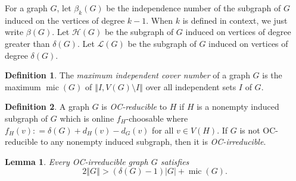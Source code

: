 \documentclass[12pt]{article}
\title{}
\author{}
\theoremstyle{plain}
\newtheorem{lem}[thm]{Lemma}
\theoremstyle{definition}
\newtheorem{defn}{Definition}
\theoremstyle{remark}
\newcommand{\fancy}[1]{\mathcal{#1}}
\renewcommand{\L}{\fancy{L}}
\newcommand{\HH}{\fancy{H}}
\newcommand{\card}[1]{\left|#1\right|}
\newcommand{\size}[1]{\left\Vert#1\right\Vert}
\newcommand{\DefinedAs}{\mathrel{\mathop:}=}
\newcommand{\mic}{\operatorname{mic}}
\begin{document}
\maketitle

For a graph $G$, let $\beta_k(G)$ be the independence number of the subgraph of $G$ induced on the vertices of degree $k-1$.  
When $k$ is defined in context, we just write $\beta(G)$.  Let $\HH(G)$ be the subgraph of $G$ induced on vertices of degree greater than $\delta(G)$.
Let $\L(G)$ be the subgraph of $G$ induced on vertices of degree $\delta(G)$.
\begin{defn} The \emph{maximum independent cover number }of a graph $G$
	is the maximum $\mic(G)$ of $\size{I, V(G) \setminus I}$ over all independent sets $I$
	of $G$. 
\end{defn}

\begin{defn} A graph $G$ is \emph{OC-reducible} to $H$ if $H$ is a nonempty induced
subgraph of $G$ which is online $f_{H}$-choosable where $f_{H}(v)\DefinedAs\delta(G)+d_{H}(v)-d_{G}(v)$
for all $v\in V(H)$. If $G$ is not OC-reducible to any nonempty induced subgraph,
then it is \emph{OC-irreducible}. 
\end{defn}

\begin{lem}\label{ConsantListMicStrength} 
	Every OC-irreducible graph $G$ satisfies
	\[2\size{G} > (\delta(G) - 1)\card{G} + \mic(G).\]
\end{lem}
\end{document}
